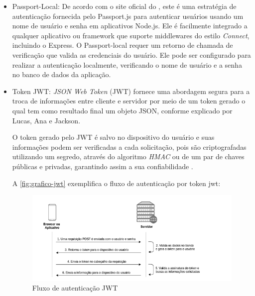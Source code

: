 \begin{itemize}
    \item Passport-Local: De acordo com o site oficial do \cite{passport84}, este é uma estratégia de autenticação fornecida pelo Passport.js para autenticar usuários usando um nome de usuário e senha em aplicativos Node.js. Ele é facilmente integrado a qualquer aplicativo ou framework que suporte middlewares do estilo \textit{Connect}, incluindo o Express. O Passport-local requer um retorno de chamada de verificação que valida as credenciais do usuário. Ele pode ser configurado para realizar a autenticação localmente, verificando o nome de usuário e a senha no banco de dados da aplicação. 
    \item Token JWT: \textit{JSON Web Token} (JWT) fornece uma abordagem segura para a troca de informações entre cliente e servidor por meio de um token gerado o qual tem como resultado final um objeto JSON, conforme explicado por Lucas, Ana e Jackson.
    \begin{citacao}
        O token gerado pelo JWT é salvo
        no dispositivo do usuário e suas informações podem ser verificadas a cada solicitação,
        pois são criptografadas utilizando um segredo, através do algoritmo \textit{HMAC} ou de um par de chaves públicas e privadas, garantindo assim a sua confiabilidade \cite{segurancaeauth}.
    \end{citacao}
    A \autoref{fig:grafico-jwt} exemplifica o fluxo de autenticação por token jwt: 

\begin{figure}
    \caption{\label{fig:grafico-jwt} Fluxo de autenticação JWT}
    \begin{center}
        \includegraphics[scale=0.9]{imagens/jwt.png}
    \end{center}
\end{figure}
    
\end{itemize}

